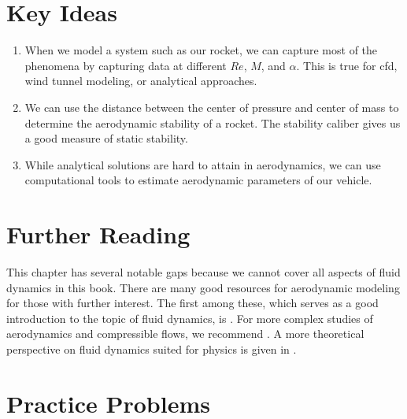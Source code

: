 \documentclass[10pt, openany, titlepage]{book}
\theoremstyle{definition}
\begin{document}
\section{Key Ideas}
\begin{enumerate}
    \item When we model a system such as our rocket, we can capture most of the phenomena by capturing data at different $Re$, $M$, and $\alpha$. This is true for \gls{cfd}, wind tunnel modeling, or analytical approaches.
    \item We can use the distance between the center of pressure and center of mass to determine the aerodynamic stability of a rocket. The stability caliber gives us a good measure of static stability.
    \item While analytical solutions are hard to attain in aerodynamics, we can use computational tools to estimate aerodynamic parameters of our vehicle.
\end{enumerate}

\section{Further Reading}

This chapter has several notable gaps because we cannot cover all aspects of fluid dynamics in this book. There are many good resources for aerodynamic modeling for those with further interest. The first among these, which serves as a good introduction to the topic of fluid dynamics, is \cite{anderson_fundamentals_2017}. For more complex studies of aerodynamics and compressible flows, we recommend \cite{anderson_modern_2021}. A more theoretical perspective on fluid dynamics suited for physics is given in \cite{landau_fluid_2013}.

\newpage
\section{Practice Problems}
\end{document}
